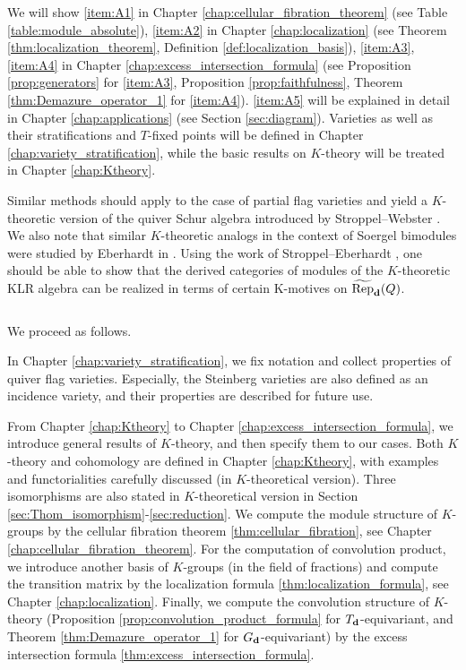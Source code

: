 We will show \eqref{item:A1} in Chapter \ref{chap:cellular_fibration_theorem} (see Table \ref{table:module_absolute}), \eqref{item:A2} in Chapter \ref{chap:localization} (see Theorem \ref{thm:localization_theorem}, Definition \ref{def:localization_basis}), \eqref{item:A3}, \eqref{item:A4} in Chapter \ref{chap:excess_intersection_formula} (see Proposition \ref{prop:generators} for \eqref{item:A3}, Proposition \ref{prop:faithfulness}, Theorem \ref{thm:Demazure_operator_1} for \eqref{item:A4}). \eqref{item:A5} will be explained in detail in Chapter \ref{chap:applications} (see Section \ref{sec:diagram}). Varieties as well as their stratifications and $T$-fixed points will be defined in Chapter \ref{chap:variety_stratification}, while the basic results on $K$-theory will be treated in Chapter \ref{chap:Ktheory}.

Similar methods should apply to the case of partial flag varieties and yield a $K$-theoretic version of the quiver Schur algebra introduced by Stroppel--Webster \cite{https://doi.org/10.48550/arxiv.1110.1115}. We also note that similar $K$-theoretic analogs in the context of Soergel bimodules were studied by Eberhardt in  \cite{Eberhardt2022Koszul,https://doi.org/10.48550/arxiv.2208.01665}. Using the work of Stroppel--Eberhardt \cite{https://doi.org/10.48550/arxiv.1110.1115}, one should be able to show that the derived categories of modules of the $K$-theoretic KLR algebra can be realized in terms of certain K-motives on $\operatorname{\widetilde{\operatorname{Rep}}}_{\mathbf{d}}(Q)$.

$\,$

We proceed as follows.

In Chapter \ref{chap:variety_stratification}, we fix notation and collect properties of quiver flag varieties. Especially, the Steinberg varieties are also defined as an incidence variety, and their properties are described for future use.

From Chapter \ref{chap:Ktheory} to Chapter \ref{chap:excess_intersection_formula}, we introduce general results of $K$-theory, and then specify them to our cases. Both $K$-theory and cohomology are defined in Chapter \ref{chap:Ktheory}, with examples and functorialities carefully discussed (in $K$-theoretical version). Three isomorphisms are also stated in $K$-theoretical version in Section \ref{sec:Thom_isomorphism}-\ref{sec:reduction}. We compute the module structure of $K$-groups by the cellular fibration theorem \ref{thm:cellular_fibration}, see Chapter \ref{chap:cellular_fibration_theorem}. For the computation of convolution product, we introduce another basis of $K$-groups (in the field of fractions) and compute the transition matrix by the localization formula \ref{thm:localization_formula}, see Chapter \ref{chap:localization}. Finally, we compute the convolution structure of $K$-theory (Proposition \ref{prop:convolution_product_formula} for $T_{\mathbf{d}}$-equivariant, and Theorem \ref{thm:Demazure_operator_1} for $G_{\mathbf{d}}$-equivariant) by the excess intersection formula \ref{thm:excess_intersection_formula}.

